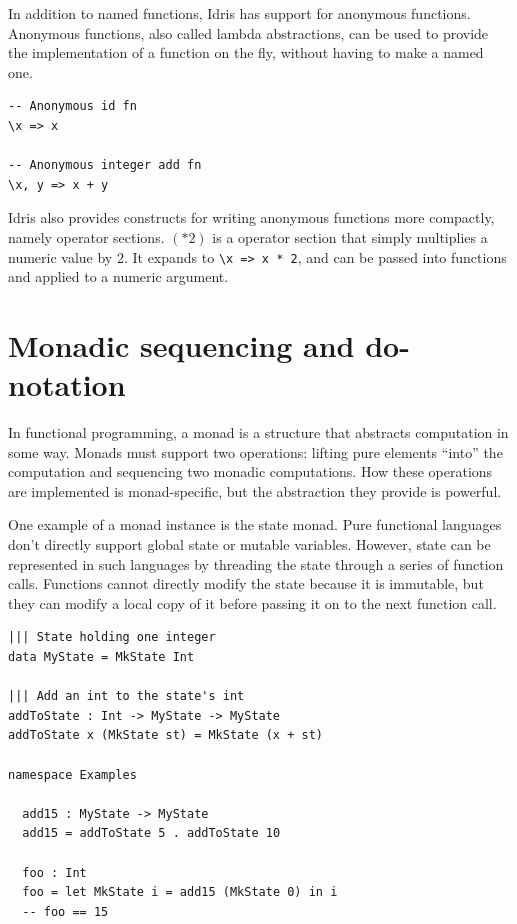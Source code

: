 \documentclass[12pt]{report}
\begin{document}
In addition to named functions, Idris has support for anonymous functions.
Anonymous functions, also called lambda abstractions, can be used to provide the implementation of a function on the fly, without having to make a named one.

\begin{lstlisting}[caption={Anonymous functions Example},label={lst:anon_fns}]
-- Anonymous id fn
\x => x

-- Anonymous integer add fn
\x, y => x + y
\end{lstlisting}

Idris also provides constructs for writing anonymous functions more compactly, namely operator sections.
$(*2)$ is a operator section that simply multiplies a numeric value by 2.
It expands to \lstinline{\x => x * 2}, and can be passed into functions and applied to a numeric argument.

\section{Monadic sequencing and do-notation}

In functional programming, a monad is a structure that abstracts computation in some way.
Monads must support two operations: lifting pure elements ``into'' the computation and sequencing two monadic computations.
How these operations are implemented is monad-specific, but the abstraction they provide is powerful.

One example of a monad instance is the state monad.
Pure functional languages don't directly support global state or mutable variables.
However, state can be represented in such languages by threading the state through a series of function calls.
Functions cannot directly modify the state because it is immutable, but they can modify a local copy of it before passing it on to the next function call.

\begin{lstlisting}[caption={Threading state through function calls, no monad},label={lst:state_example}]
||| State holding one integer
data MyState = MkState Int

||| Add an int to the state's int
addToState : Int -> MyState -> MyState
addToState x (MkState st) = MkState (x + st)

namespace Examples

  add15 : MyState -> MyState
  add15 = addToState 5 . addToState 10

  foo : Int
  foo = let MkState i = add15 (MkState 0) in i
  -- foo == 15
\end{lstlisting}
\end{document}
